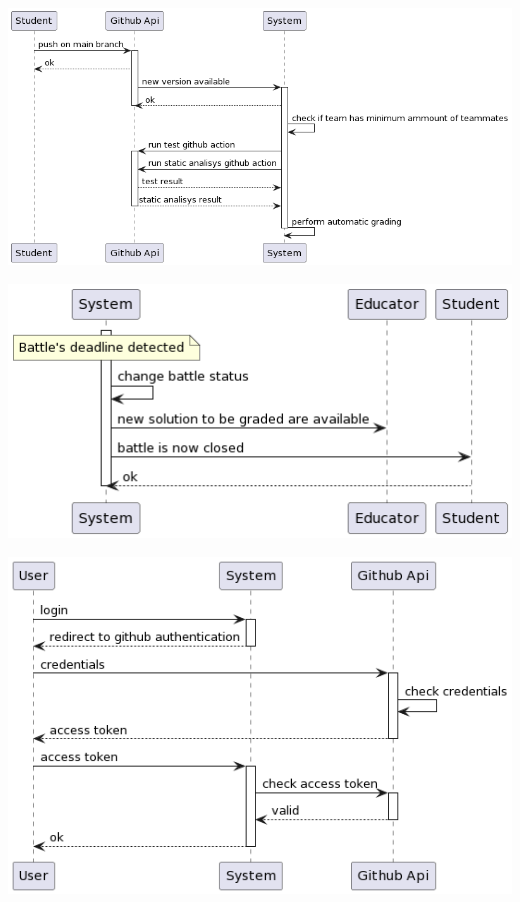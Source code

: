 \documentclass{article}
\begin{document}
\begin{center}
    \includegraphics[width=\linewidth]{image7.png}
  \label{fig:uc11}
\end{center}

\begin{center}
    \includegraphics[width=\linewidth]{image20.png}
  \label{fig:uc12}
\end{center}

\begin{center}
    \includegraphics[width=\linewidth]{image3.png}
  \label{fig:uc13}
\end{center}
\end{document}

